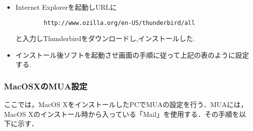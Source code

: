 \documentclass[a4j,titlepage]{jarticle}
\begin{document}
\begin{itemize}
\item Internet Explorerを起動しURLに

  \begin{center}
    \begin{screen}
      \begin{verbatim}
        http://www.ozilla.org/en-US/thunderbird/all
\end{verbatim}
    \end{screen}
  \end{center}
  
と入力しThunderbirdをダウンロードし,インストールした.
  
\item インストール後ソフトを起動させ画面の手順に従って上記の表のように設定する.\\
  \end{itemize}

\subsubsection{MacOSXのMUA設定}
ここでは，MacOS XをインストールしたPCでMUAの設定を行う．MUAには，MacOS Xのインストール時から入っている「Mail」を使用する．その手順を以下に示す．
\end{document}
